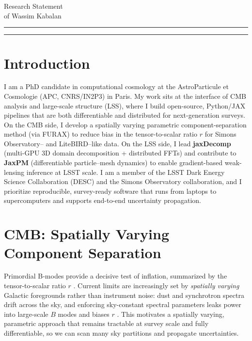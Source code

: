 \documentclass{article}
\newcommand{\soptitle}{Research Statement}
\newcommand{\yourname}{Wassim Kabalan}
\begin{document}
\begin{center}
  {\LARGE \soptitle}\\[4pt]
  {\large of \yourname}
\end{center}

\hrule
\vspace{1pt}
\hrule height 1pt
\bigskip

\section*{Introduction}
I am a PhD candidate in computational cosmology at the AstroParticule et Cosmologie (APC, CNRS/IN2P3) in Paris. My work sits at the interface of CMB analysis and large-scale structure (LSS), where I build open-source, Python/JAX pipelines that are both differentiable and distributed for next-generation surveys. On the CMB side, I develop a spatially varying parametric component-separation method (via FURAX) to reduce bias in the tensor-to-scalar ratio \(r\) for Simons Observatory– and LiteBIRD–like data. On the LSS side, I lead \textbf{jaxDecomp} (multi-GPU 3D domain decomposition + distributed FFTs) and contribute to \textbf{JaxPM} (differentiable particle–mesh dynamics) to enable gradient-based weak-lensing inference at LSST scale. I am a member of the LSST Dark Energy Science Collaboration (DESC) and the Simons Observatory collaboration, and I prioritize reproducible, survey-ready software that runs from laptops to supercomputers and supports end-to-end uncertainty propagation.

\section*{CMB: Spatially Varying Component Separation}


Primordial B-modes provide a decisive test of inflation, summarized by the tensor-to-scalar ratio $r$ \citep{KamionkowskiKovetz2016}. Current limits are increasingly set by \emph{spatially varying} Galactic foregrounds rather than instrument noise: dust and synchrotron spectra drift across the sky, and enforcing sky-constant spectral parameters leaks power into large-scale $B$ modes and biases $r$ \citep{Planck2018IV}. This motivates a spatially varying, parametric approach that remains tractable at survey scale and fully differentiable, so we can scan many sky partitions and propagate uncertainties.
\end{document}
